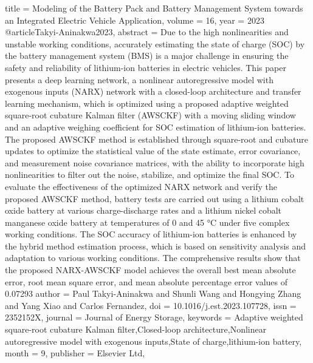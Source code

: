 {{{{{{{{{   title = {Modeling of the Battery Pack and Battery Management System towards an Integrated Electric Vehicle Application},
   volume = {16},
   year = {2023}
}
@article{Takyi-Aninakwa2023,
   abstract = {Due to the high nonlinearities and unstable working conditions, accurately estimating the state of charge (SOC) by the battery management system (BMS) is a major challenge in ensuring the safety and reliability of lithium-ion batteries in electric vehicles. This paper presents a deep learning network, a nonlinear autoregressive model with exogenous inputs (NARX) network with a closed-loop architecture and transfer learning mechanism, which is optimized using a proposed adaptive weighted square-root cubature Kalman filter (AWSCKF) with a moving sliding window and an adaptive weighing coefficient for SOC estimation of lithium-ion batteries. The proposed AWSCKF method is established through square-root and cubature updates to optimize the statistical value of the state estimate, error covariance, and measurement noise covariance matrices, with the ability to incorporate high nonlinearities to filter out the noise, stabilize, and optimize the final SOC. To evaluate the effectiveness of the optimized NARX network and verify the proposed AWSCKF method, battery tests are carried out using a lithium cobalt oxide battery at various charge-discharge rates and a lithium nickel cobalt manganese oxide battery at temperatures of 0 and 45 °C under five complex working conditions. The SOC accuracy of lithium-ion batteries is enhanced by the hybrid method estimation process, which is based on sensitivity analysis and adaptation to various working conditions. The comprehensive results show that the proposed NARX-AWSCKF model achieves the overall best mean absolute error, root mean square error, and mean absolute percentage error values of 0.07293%
   author = {Paul Takyi-Aninakwa and Shunli Wang and Hongying Zhang and Yang Xiao and Carlos Fernandez},
   doi = {10.1016/j.est.2023.107728},
   issn = {2352152X},
   journal = {Journal of Energy Storage},
   keywords = {Adaptive weighted square-root cubature Kalman filter,Closed-loop architecture,Nonlinear autoregressive model with exogenous inputs,State of charge,lithium-ion battery},
   month = {9},
   publisher = {Elsevier Ltd},
}}}}}}}}}}
